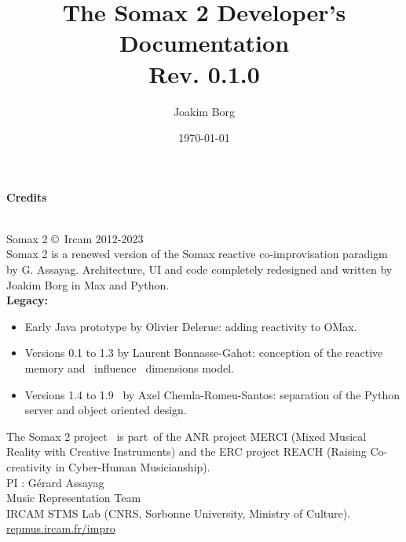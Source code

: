 \documentclass[10pt]{report}
\title{The Somax 2 Developer's Documentation\\[0.24cm]
	\large{Rev. 0.1.0}}
\author{Joakim Borg }
\date{\today}
\begin{document}
\maketitle
\chapter*{}
\large{\textbf{Credits}\\}\\
\small{
Somax 2 \copyright \ Ircam 2012-2023\\

\noindent Somax 2 is a renewed version of the Somax reactive co-improvisation paradigm by G. Assayag.
Architecture, UI and code completely redesigned and written by Joakim Borg in Max and Python.
\\

\noindent \textbf{Legacy:}
\begin{itemize}
\item Early Java prototype by Olivier Delerue: adding reactivity to OMax.
\item Versions 0.1 to 1.3 by Laurent Bonnasse-Gahot: conception of the reactive memory and  influence  dimensions model.
\item Versions 1.4 to 1.9  by Axel Chemla-Romeu-Santos: separation of the Python server and object oriented design.
\end{itemize}

\medskip
\noindent The Somax 2 project  is part of the ANR project MERCI (Mixed Musical Reality with Creative Instruments) and the ERC project REACH (Raising Co-creativity in Cyber-Human Musicianship).
\\

\noindent PI : Gérard Assayag\\
Music Representation Team\\
IRCAM STMS Lab (CNRS, Sorbonne University, Ministry of Culture).
\\

\noindent\url{repmus.ircam.fr/impro}
}


\tableofcontents








{}

\end{document}
